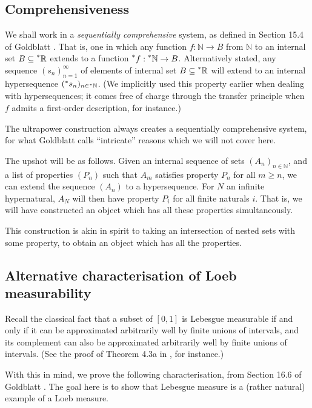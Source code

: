 \documentclass[11pt]{amsart}
\theoremstyle{remark}
\newcommand{\hyp}[1][\mathbb{R}]{\prescript{*}{}{#1}}
\begin{document}
\subsection{Comprehensiveness} \label{sec:comprehensiveness}
We shall work in a \emph{sequentially comprehensive} system, as defined in Section 15.4 of Goldblatt \cite{goldblatt}.
That is, one in which any function $f: \mathbb{N} \to B$ from $\mathbb{N}$ to an internal set $B \subseteq \hyp$ extends to a function $\hyp[f]: \hyp[\mathbb{N}] \to B$.
Alternatively stated, any sequence $(s_n)_{n=1}^{\infty}$ of elements of internal set $B \subseteq \hyp$ will extend to an internal hypersequence $(\hyp[s_n])_{n \in \hyp[\mathbb{N}]}$.
(We implicitly used this property earlier when dealing with hypersequences; it comes free of charge through the transfer principle when $f$ admits a first-order description, for instance.)

The ultrapower construction always creates a sequentially comprehensive system, for what Goldblatt calls ``intricate'' reasons which we will not cover here.

The upshot will be as follows.
Given an internal sequence of sets $(A_n)_{n \in \mathbb{N}}$, and a list of properties $(P_n)$ such that $A_m$ satisfies property $P_n$ for all $m \geq n$, we can extend the sequence $(A_n)$ to a hypersequence.
For $N$ an infinite hypernatural, $A_N$ will then have property $P_i$ for all finite naturals $i$.
That is, we will have constructed an object which has all these properties simultaneously.

This construction is akin in spirit to taking an intersection of nested sets with some property, to obtain an object which has all the properties.

\subsection{Alternative characterisation of Loeb measurability} \label{sec:alternativeloeb}

Recall the classical fact that a subset of $[0,1]$ is Lebesgue measurable if and only if it can be approximated arbitrarily well by finite unions of intervals, and its complement can also be approximated arbitrarily well by finite unions of intervals.
(See the proof of Theorem 4.3a in \cite{williamson}, for instance.)

With this in mind, we prove the following characterisation, from Section 16.6 of Goldblatt \cite{goldblatt}.
The goal here is to show that Lebesgue measure is a (rather natural) example of a Loeb measure.
\end{document}
